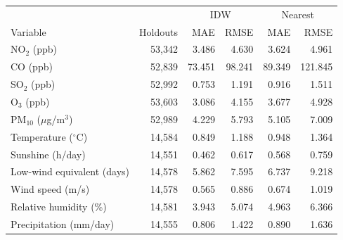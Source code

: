 \begin{tabular}{@{}lrrrrr@{}}
\toprule
& & \multicolumn{2}{c}{IDW} & \multicolumn{2}{c}{Nearest}\\
Variable & Holdouts & MAE & RMSE & MAE & RMSE\\
\midrule
NO$_2$ (ppb) & 53,342 & 3.486 & 4.630 & 3.624 & 4.961 \\
CO (ppb) & 52,839 & 73.451 & 98.241 & 89.349 & 121.845 \\
SO$_2$ (ppb) & 52,992 & 0.753 & 1.191 & 0.916 & 1.511 \\
O$_3$ (ppb) & 53,603 & 3.086 & 4.155 & 3.677 & 4.928 \\
PM$_{10}$ ($\mu$g/m$^3$) & 52,989 & 4.229 & 5.793 & 5.105 & 7.009 \\
Temperature ($^\circ$C) & 14,584 & 0.849 & 1.188 & 0.948 & 1.364 \\
Sunshine (h/day) & 14,551 & 0.462 & 0.617 & 0.568 & 0.759 \\
Low-wind equivalent (days) & 14,578 & 5.862 & 7.595 & 6.737 & 9.218 \\
Wind speed (m/s) & 14,578 & 0.565 & 0.886 & 0.674 & 1.019 \\
Relative humidity (\%) & 14,581 & 3.943 & 5.074 & 4.963 & 6.366 \\
Precipitation (mm/day) & 14,555 & 0.806 & 1.422 & 0.890 & 1.636 \\
\bottomrule
\end{tabular}
